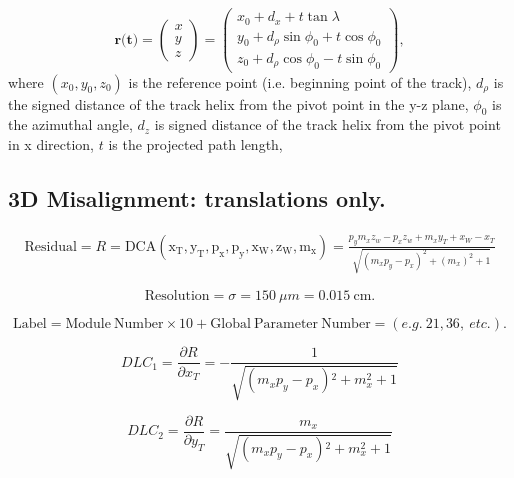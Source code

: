 \documentclass[a4paper,11pt]{article}
\begin{document}
\begin{equation}
\textbf{r(t)} = \begin{pmatrix} x \\ y \\ z \end{pmatrix} = \begin{pmatrix} x_0 + d_x + t\tan\lambda \  \\ y_0 + d_\rho\sin\phi_0 + t\cos\phi_0 \\ z_0 + d_\rho \cos\phi_0 - t \sin\phi_0 \end{pmatrix},
\end{equation}
where $(x_0, y_0, z_0)$ is the reference point (i.e. beginning point of the track), $d_\rho$ is the signed distance of the track helix from the pivot point in the y-z plane, $\phi_0$ is the azimuthal angle, $d_z$ is signed distance of the track helix from the pivot point in x direction, $t$ is the projected path length, 


\clearpage

\subsection{3D Misalignment: translations only.}

\begin{equation}
\begin{split}
\mathrm{Residual} = R = \mathrm{DCA(x_T, y_T, p_x, p_y, x_W, z_W, m_x)} = \frac{ p_ym_xz_w-p_xz_w + m_xy_T + x_W - x_T }{\sqrt{(m_x p_y-p_x)^2+(m_x)^2+1}}
\end{split}
\end{equation}

\begin{equation}	
\mathrm{Resolution} = \sigma = 150 \ \mu m = 0.015 \ \mathrm{cm}.
\end{equation}

\begin{equation}	
\mathrm{Label}= \mathrm{Module \ Number} \times 10 + \mathrm{Global \ Parameter \ Number} = (e.g. \ 21, 36, \ etc.).
\end{equation}

\begin{equation}
DLC_1 = \frac{\partial R}{\partial x_T} =   -\frac{1}{\sqrt{\left(m_x p_y-p_x\right){}^2+m_x^2+1}}
\end{equation}

\begin{equation}
DLC_2 = \frac{ \partial R}{\partial y_T} =  \frac{m_x}{\sqrt{\left(m_x p_y-p_x\right){}^2+m_x^2+1}} 
\end{equation}
\end{document}

